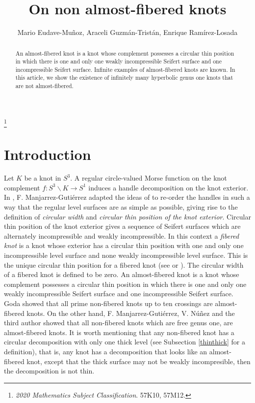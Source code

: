 \documentclass[12pt]{amsart}
\title{On non almost-fibered knots}
\author[Mario Eudave-Mu\~noz, Araceli Guzm\'an-Trist\'an, Enrique Ram\'irez-Losada]{Mario Eudave-Mu\~noz, Araceli Guzm\'an-Trist\'an, Enrique Ram\'irez-Losada}
\newcommand\blfootnote[1]{%
  \begingroup
  \renewcommand\thefootnote{}\footnote{#1}%
  \addtocounter{footnote}{-1}%
  \endgroup
}
\begin{document}
  

\blfootnote{{\it 2020 Mathematics Subject Classification}.
   57K10, 57M12.}
    
\begin{abstract}
 An almost-fibered knot is a knot whose complement possesses a circular thin position in which there is one and only one weakly incompressible Seifert surface and one incompressible Seifert surface. Infinite examples of almost-fibered knots are known. In this article, we show the existence of infinitely many hyperbolic genus one knots that are not almost-fibered. 
\end{abstract}

\maketitle

\section{Introduction}

Let $K$ be a knot in $S^3$. A regular circle-valued Morse function on the knot complement $f:S^3\backslash K\to S^1$ induces a handle decomposition on the knot exterior. In \cite{Fabiola}, F. Manjarrez-Guti\'errez adapted the ideas of \cite{ST} to re-order the handles in such a way that the regular level surfaces are as simple as possible, giving rise to the definition of \emph{circular width} and \emph{circular thin position of the knot exterior}. Circular thin position of the knot exterior gives a sequence of Seifert surfaces which are alternately incompressible and weakly incompressible. In this context a \emph{fibered knot} is a knot whose exterior has a circular thin position with one and only one incompressible level surface and none weakly incompressible level surface. This is the unique circular thin position for a fibered knot (see \cite{Burde} or \cite{Whitten}). The circular width of a fibered knot is defined to be zero. An almost-fibered knot is a knot whose complement possesses a circular thin position in which there is one and only one weakly incompressible Seifert surface and one incompressible Seifert surface. Goda \cite{Goda} showed that all prime non-fibered knots up to ten crossings are almost-fibered knots. On the other hand, F. Manjarrez-Guti\'errez, V. N\'uñez and the third author \cite{FabKikPis} showed that all non-fibered knots which are free genus one, are almost-fibered knots.  It is worth mentioning that any non-fibered knot has a circular decomposition with only one thick level (see Subsection \ref{thinthick} for a definition), that is, any knot has a decomposition that looks like an almost-fibered knot, except that the thick surface may not be weakly incompresible, then the decomposition is not thin.
\end{document}
